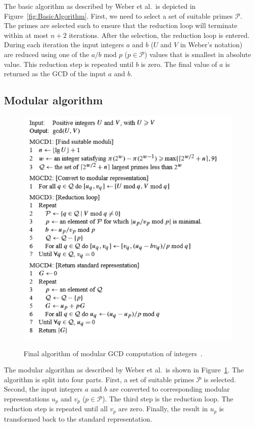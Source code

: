The basic algorithm as described by Weber et al.\ is depicted in Figure~\ref{fig:BasicAlgorithm}. First, we need to select a set of suitable primes $\mathcal{P}$. The primes are selected such to ensure that the reduction loop will terminate within at most \mbox{$n + 2$} iterations. After the selection, the reduction loop is entered. During each iteration the input integers $a$ and $b$ ($U$ and $V$ in Weber's notation) are reduced using one of the \mbox{$a / b\text{ mod }p$} \mbox{($p \in \mathcal{P}$)} values that is smallest in absolute value. This reduction step is repeated until $b$ is zero. The final value of $a$ is returned as the GCD of the input $a$ and $b$.

\subsection{Modular algorithm}

\begin{figure}
\caption{Final algorithm of modular GCD computation of integers~\cite{modularInteger}.}
\centering
\includegraphics[scale=0.6]{texfiles/integer_mod.PNG}
 \label{fig:ModularAlgorithm}
\end{figure}

The modular algorithm as described by Weber et al.\ is shown in Figure~\ref{fig:ModularAlgorithm}. The algorithm is split into four parts. First, a set of suitable primes $\mathcal{P}$ is selected. Second, the input integers $a$ and $b$ are converted to corresponding modular representations $u_p$ and $v_p$ ($p \in \mathcal{P}$). The third step is the reduction loop. The reduction step is repeated until all $v_p$ are zero. Finally, the result in $u_p$ is transformed back to the standard representation.

